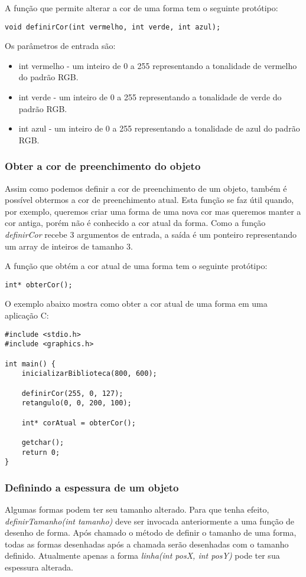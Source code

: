 \documentclass[12pt, %
openright,
oneside, %
a4paper,    %
brazil]{facom-ufu-abntex2}
\begin{document}
A função que permite alterar a cor de uma forma tem o seguinte protótipo:

\begin{lstlisting}
void definirCor(int vermelho, int verde, int azul);
\end{lstlisting}

Os parâmetros de entrada são:

\begin{itemize}
    \item int vermelho - um inteiro de 0 a 255 representando a tonalidade de vermelho do padrão RGB.
    \item int verde - um inteiro de 0 a 255 representando a tonalidade de verde do padrão RGB.
    \item int azul - um inteiro de 0 a 255 representando a tonalidade de azul do padrão RGB.
\end{itemize}

\subsubsection{Obter a cor de preenchimento do objeto}
Assim como podemos definir a cor de preenchimento de um objeto, também é possível obtermos a cor de preenchimento atual. Esta função se faz útil quando, por exemplo, queremos criar uma forma de uma nova cor mas queremos manter a cor antiga, porém não é conhecido a cor atual da forma. Como a função \textit{definirCor} recebe 3 argumentos de entrada, a saída é um ponteiro representando um array de inteiros de tamanho 3.

A função que obtém a cor atual de uma forma tem o seguinte protótipo:

\begin{lstlisting}
int* obterCor();
\end{lstlisting}

O exemplo abaixo mostra como obter a cor atual de uma forma em uma aplicação C:

\begin{lstlisting}
#include <stdio.h>
#include <graphics.h>

int main() {
    inicializarBiblioteca(800, 600);

    definirCor(255, 0, 127);
    retangulo(0, 0, 200, 100);

    int* corAtual = obterCor();

    getchar();
    return 0;
}
\end{lstlisting}

\subsubsection{Definindo a espessura de um objeto}
Algumas formas podem ter seu tamanho alterado. Para que tenha efeito, \textit{definirTamanho(int tamanho)} deve ser invocada anteriormente a uma função de desenho de forma. Após chamado o método de definir o tamanho de uma forma, todas as formas desenhadas após a chamada serão desenhadas com o tamanho definido. Atualmente apenas a forma \textit{linha(int posX, int posY)} pode ter sua espessura alterada.
\end{document}
